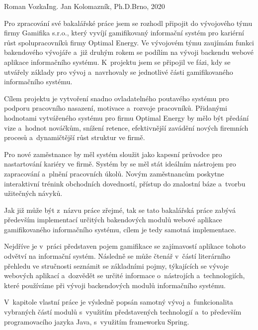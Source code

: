 \documentclass[12pt]{article}
\begin{document}
\pagestyle{headings}

\def\typprace{Bakalářská}

{Roman Vozka}{Ing. Jan Kolomazník, Ph.D.}{Brno, 2020}


\obsah
{}



Pro zpracování své bakalářské práce
jsem se rozhodl připojit do vývojového týmu firmy Gamifika s.r.o.,
který vyvíjí gamifikovaný informační systém 
pro kariérní růst spolupracovníků firmy Optimal Energy.
Ve vývojovém týmu zaujímám funkci bakendového vývojáře 
a~již druhým rokem se podílím na vývoji backendu webové aplikace informačního systému.
K~projektu jsem se připojil ve fázi, kdy se utvářely základy pro vývoj
a~navrhovaly se jednotlivé části gamifikovaného informačního systému.


Cílem projektu je vytvoření snadno ovladatelného poutavého systému
pro podporu pracovního nasazení, motivace a~rozvoje pracovníků.
Přidanými hodnotami vytvářeného systému pro firmu Optimal Energy
by mělo být předání vize a~hodnot nováčkům, snížení retence,
efektivnější zavádění nových firemních procesů 
a~dynamičtější růst struktur ve firmě. 


Pro nové zaměstnance by měl systém sloužit
jako kapesní průvodce pro nastartování kariéry ve firmě.
Systém by se měl stát ideálním nástrojem pro zapracování
a~plnění pracovních úkolů.
Novým zaměstnancům poskytne interaktivní trénink obchodních dovedností,
přístup do znalostní báze a~tvorbu užitečných návyků.


Jak již může být z~názvu práce zřejmé, tak se tato bakalářská práce
zabývá především implementací určitých bakendových modulů webové aplikace
gamifikovaného informačního systému, cílem je tedy samotná implementace.


Nejdříve je v~práci představen pojem gamifikace se 
zajímavostí aplikace tohoto odvětví na informační systém.
Následně se může čtenář v~částí literárního přehledu
ve stručnosti seznámit se základními pojmy,
týkajících se vývoje webových aplikací a~dozvědět se určité informace o~nástrojích a~technologiích,
které používáme při vývoji backendových modulů informačního systému.

V~kapitole vlastní práce je výsledně popsán samotný vývoj a~funkcionalita
vybraných částí modulů s~využitím představených technologií
a~to především programovacího jazyka Java, s~využitím frameworku Spring.
\end{document}
